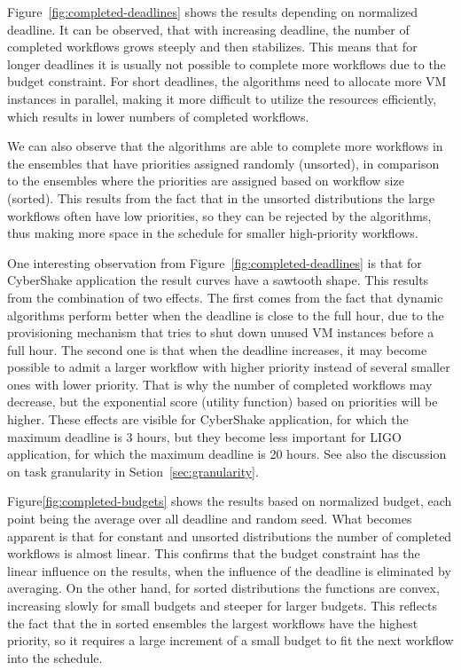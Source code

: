 \documentclass[preprint,5p]{elsarticle}
\begin{document}
Figure~\ref{fig:completed-deadlines} shows the results depending on normalized
deadline. It can be observed, that with increasing deadline, the number of
completed workflows grows steeply and then stabilizes. This means that for
longer deadlines it is usually not possible to complete more workflows due to
the budget constraint. For short deadlines, the algorithms need to allocate more
VM instances in parallel, making it more difficult to utilize the resources
efficiently, which results in lower numbers of completed workflows.

We can also observe that the algorithms are able to complete more workflows in
the ensembles that have priorities assigned randomly (unsorted), in comparison
to the ensembles where the priorities are assigned based on workflow size
(sorted). This results from the fact that in the unsorted distributions the large
workflows often have low priorities, so they can be rejected by the algorithms,
thus making more space in the schedule for smaller high-priority workflows.

One interesting observation from Figure~\ref{fig:completed-deadlines} is that for
CyberShake application the result curves have a sawtooth shape. This results
from the combination of two effects. The first comes from the fact that dynamic
algorithms perform better when the deadline is close to the full hour, due to
the provisioning mechanism that tries to shut down unused VM instances before a
full hour. The second one is that when the deadline increases, it may become
possible to admit a larger workflow with higher priority instead of several
smaller ones with lower priority. That is why the number of completed workflows
may decrease, but the exponential score (utility function) based on priorities
will be higher. These effects are visible for CyberShake application, for which
the maximum deadline is 3 hours, but they become less important for LIGO
application, for which the maximum deadline is 20 hours. See also the discussion
on task granularity in Setion~\ref{sec:granularity}.

Figure\ref{fig:completed-budgets} shows the results based on normalized budget,
each point being the average over all deadline and random seed. What becomes
apparent is that for constant and unsorted distributions the number of completed
workflows is almost linear. This confirms that the budget constraint has the
linear influence on the results, when the influence of the deadline is
eliminated by averaging. On the other hand, for sorted distributions the
functions are convex, increasing slowly for small budgets and steeper for larger
budgets. This reflects the fact that the in sorted ensembles the largest
workflows have the highest priority, so it requires a large increment of a small
budget to fit the next workflow into the schedule.
\end{document}
